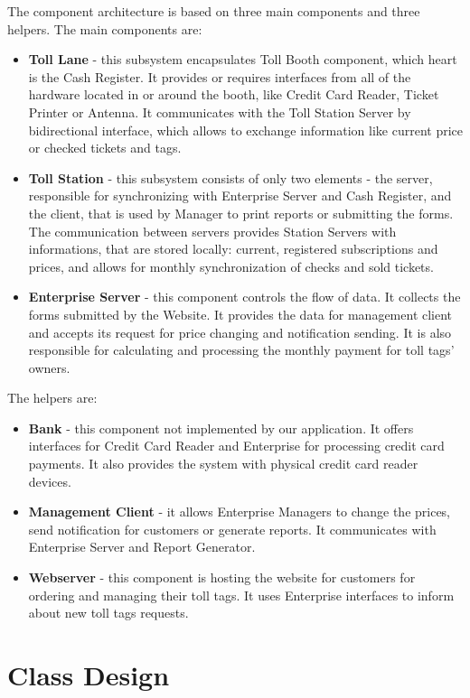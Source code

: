 The component architecture is based on three main components and three helpers. 
The main components are:
\begin{itemize}
\item \textbf{Toll Lane} - this subsystem encapsulates Toll Booth component, which heart is the Cash Register. It provides or requires interfaces from all of the hardware located in or around the booth, like Credit Card Reader, Ticket Printer or Antenna. It communicates with the Toll Station Server by bidirectional interface, which allows to exchange information like current price or checked tickets and tags.
\item \textbf{Toll Station} - this subsystem consists of only two elements - the server, responsible for synchronizing with Enterprise Server and Cash Register, and the client, that is used by Manager to print reports or submitting the forms. The communication between servers provides Station Servers with informations, that are stored locally: current, registered subscriptions and prices, and allows for monthly synchronization of checks and sold tickets. 
\item \textbf{Enterprise Server} - this component controls the flow of data. It collects the forms submitted by the Website. It provides the data for management client and accepts its request for price changing and notification sending. It is also responsible for calculating and processing the monthly payment for toll tags' owners.
\end{itemize}
The helpers are:
\begin{itemize}
\item \textbf{Bank} - this component not implemented by our application. It offers interfaces for Credit Card Reader and Enterprise for processing credit card payments. It also provides the system with physical credit card reader devices.
\item \textbf{Management Client} - it allows Enterprise Managers to change the prices, send notification for customers or generate reports. It communicates with Enterprise Server and Report Generator. 
\item \textbf{Webserver} - this component is hosting the website for customers for ordering and managing their toll tags. It uses Enterprise interfaces to inform about new toll tags requests. 
\end{itemize}


\section{Class Design}

